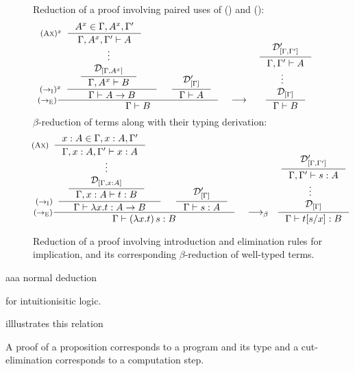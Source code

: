 \begin{figure}
Reduction of a proof involving paired uses of
() and ():
\[
\inference[($->_\textsc{E}$)]
	{\hspace*{-3em}
	 \inference[$(->_\textsc{I})^{x}$]
		{\hspace*{-1em}
		 \inference*
			{\hspace*{-4em}
			 \inference[$(\textsc{Ax})^{x}$]
				{A^x\in\Gamma,A^x,\Gamma'}
				{\Gamma,A^x,\Gamma' |- A} \\
			 \vdots \\
			 \mathcal{D}_{[\Gamma,A^x]} }
			{\Gamma,A^x |- B} }
		{\Gamma |- A -> B}
	&\inference*
		{\mathcal{D}'_{[\Gamma]}}
		{\Gamma |- A} }
	{\Gamma |- B}
\quad
\longrightarrow
~
\inference*
	{\inference*
		{\mathcal{D}'_{[\Gamma,\Gamma']}}
		{\Gamma,\Gamma' |- A} \\
	 \vdots_{\phantom{G}} \\
	 \mathcal{D}_{[\Gamma]} }
	{\Gamma |- B}
\]
$\beta$-reduction of terms along with their typing derivation:
\[
\inference[($->_\textsc{E}$)]
	{\hspace*{-3em}
	 \inference[$(->_\textsc{I})$]
		{\hspace*{-1em}
		 \inference*
			{\hspace*{-4em}
			 \inference[$(\textsc{Ax})$]
				{x:A\in\Gamma,x:A,\Gamma'}
				{\Gamma,x:A,\Gamma' |- x:A} \\
			 \vdots \\
			 \mathcal{D}_{[\Gamma,x:A]} }
			{\Gamma,x:A |- t:B} }
		{\Gamma |- \l x.t : A -> B}
	&\inference*
		{\mathcal{D}'_{[\Gamma]}}
		{\Gamma |- s:A} }
	{\Gamma |- (\l x.t)\,s:B}
\quad
\longrightarrow_\beta
~
\inference*
	{\inference*
		{\mathcal{D}'_{[\Gamma,\Gamma']}}
		{\Gamma,\Gamma' |- s:A} \\
	 \vdots_{\phantom{G}} \\
	 \mathcal{D}_{[\Gamma]} }
	{\Gamma |- t[s/x]:B}
\]
\caption{Reduction of a proof involving introduction and elimination rules
	for implication, and its corresponding $\beta$-reduction 
	of well-typed terms.}
\label{fig:proofreduce}
\end{figure}


aaa
normal deduction

for intuitionisitic logic.

illlustrates this relation


A proof of a proposition corresponds to a program and its type
and a cut-elimination corresponds to a computation step.


